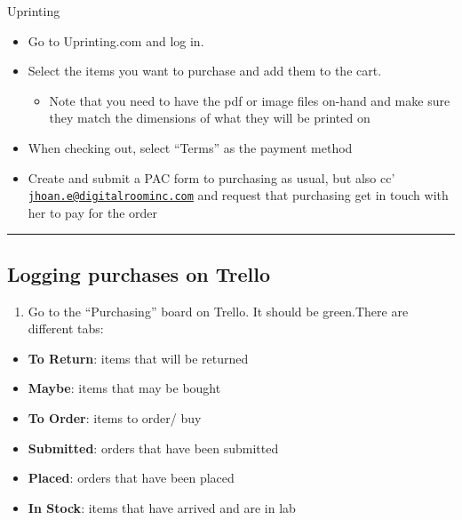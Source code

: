 \documentclass[]{book}
\providecommand{\tightlist}{%
  \setlength{\itemsep}{0pt}\setlength{\parskip}{0pt}}
\begin{document}
Uprinting

\begin{itemize}
\tightlist
\item
  Go to Uprinting.com and log in.
\item
  Select the items you want to purchase and add them to the cart.

  \begin{itemize}
  \tightlist
  \item
    Note that you need to have the pdf or image files on-hand and make sure they match the dimensions of what they will be printed on
  \end{itemize}
\item
  When checking out, select ``Terms'' as the payment method
\item
  Create and submit a PAC form to purchasing as usual, but also cc' \href{mailto:jhoan.e@digitalroominc.com}{\nolinkurl{jhoan.e@digitalroominc.com}} and request that purchasing get in touch with her to pay for the order
\end{itemize}

\begin{center}\rule{0.5\linewidth}{0.5pt}\end{center}

\hypertarget{logging-purchases-on-trello}{%
\subsection{Logging purchases on Trello}\label{logging-purchases-on-trello}}

\begin{enumerate}
\def\labelenumi{\arabic{enumi}.}
\tightlist
\item
  Go to the ``Purchasing'' board on Trello. It should be green.There are different tabs:
\end{enumerate}

\begin{itemize}
\tightlist
\item
  \textbf{To Return}: items that will be returned
\item
  \textbf{Maybe}: items that may be bought
\item
  \textbf{To Order}: items to order/ buy
\item
  \textbf{Submitted}: orders that have been submitted
\item
  \textbf{Placed}: orders that have been placed
\item
  \textbf{In Stock}: items that have arrived and are in lab
\end{itemize}
\end{document}
